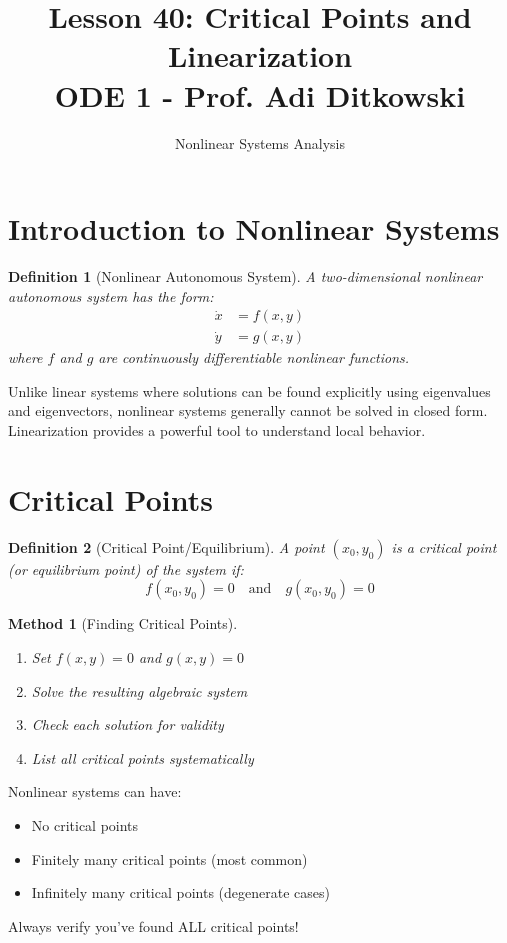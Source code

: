 \documentclass[12pt]{article}
\title{Lesson 40: Critical Points and Linearization\\
\large ODE 1 - Prof. Adi Ditkowski}
\author{Nonlinear Systems Analysis}
\date{}
\newtheorem{definition}{Definition}
\newtheorem{method}{Method}
\begin{document}
\maketitle

\section{Introduction to Nonlinear Systems}

\begin{definition}[Nonlinear Autonomous System]
A two-dimensional nonlinear autonomous system has the form:
\begin{align}
\dot{x} &= f(x,y) \\
\dot{y} &= g(x,y)
\end{align}
where $f$ and $g$ are continuously differentiable nonlinear functions.
\end{definition}

\begin{keypoint}
Unlike linear systems where solutions can be found explicitly using eigenvalues and eigenvectors, nonlinear systems generally cannot be solved in closed form. Linearization provides a powerful tool to understand local behavior.
\end{keypoint}

\section{Critical Points}

\begin{definition}[Critical Point/Equilibrium]
A point $(x_0, y_0)$ is a critical point (or equilibrium point) of the system if:
$$f(x_0, y_0) = 0 \quad \text{and} \quad g(x_0, y_0) = 0$$
\end{definition}

\begin{method}[Finding Critical Points]
\begin{enumerate}
    \item Set $f(x,y) = 0$ and $g(x,y) = 0$
    \item Solve the resulting algebraic system
    \item Check each solution for validity
    \item List all critical points systematically
\end{enumerate}
\end{method}

\begin{warning}
Nonlinear systems can have:
\begin{itemize}
    \item No critical points
    \item Finitely many critical points (most common)
    \item Infinitely many critical points (degenerate cases)
\end{itemize}
Always verify you've found ALL critical points!
\end{warning}
\end{document}
